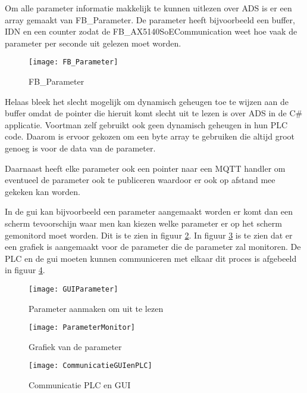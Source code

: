 Om alle parameter informatie makkelijk te kunnen uitlezen over \gls{ADS} is er een array gemaakt van FB\_Parameter. De parameter heeft bijvoorbeeld een buffer, \gls{IDN} en een counter zodat de FB\_AX5140SoECommunication weet hoe vaak de parameter per seconde uit gelezen moet worden.

\begin{figure}[H]
	\centering
	\texttt{[image: FB\_Parameter]}
	\label{fig:FB_Parameter}
	\caption{FB\_Parameter}
\end{figure}

Helaas bleek het slecht mogelijk om dynamisch geheugen toe te wijzen aan de buffer omdat de pointer die hieruit komt slecht uit te lezen is over \gls{ADS} in de C\# applicatie. Voortman zelf gebruikt ook geen dynamisch geheugen in hun \gls{PLC} code. Daarom is ervoor gekozen om een byte array te gebruiken die altijd groot genoeg is voor de data van de parameter.

\vspace{0.5cm}

Daarnaast heeft elke parameter ook een pointer naar een \gls{MQTT} handler om eventueel de parameter ook te publiceren waardoor er ook op afstand mee gekeken kan worden.

\vspace{0.5cm}

In de \gls{gui} kan bijvoorbeeld een parameter aangemaakt worden er komt dan een scherm tevoorschijn waar men kan kiezen welke parameter er op het scherm gemonitord moet worden. Dit is te zien in figuur \ref{fig:GUIParameter}. In figuur \ref{fig:ParameterMonitor} is te zien dat er een grafiek is aangemaakt voor de parameter die de parameter zal monitoren. De \gls{PLC} en de \gls{gui} moeten kunnen communiceren met elkaar dit proces is afgebeeld in figuur \ref{fig:CommunicatieGUIenPLC}.

\begin{figure}[H]
	\centering
	\texttt{[image: GUIParameter]}
	\label{fig:GUIParameter}
	\caption{Parameter aanmaken om uit te lezen}
\end{figure}

\begin{figure}[H]
	\centering
	\texttt{[image: ParameterMonitor]}
	\label{fig:ParameterMonitor}
	\caption{Grafiek van de parameter}
\end{figure}

\begin{figure}[H]
	\centering
	\texttt{[image: CommunicatieGUIenPLC]}
	\label{fig:CommunicatieGUIenPLC}
	\caption{Communicatie PLC en GUI}
\end{figure}

